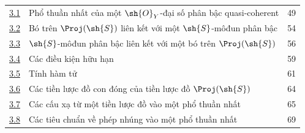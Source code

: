 \documentclass[oneside,10pt]{amsart}
\newcommand{\oldpage}[2][]{\marginnote{\normalfont\footnotesize\textbf{#1}~|~#2}\ignorespaces}
\begin{document}
\begin{longtable}{@{}p{}p{}r@{}}
\hyperref[subsection:II.3.1]{3.1} & Phổ thuần nhất của một $\sh{O}_Y$-đại số phân bậc quasi-coherent & 49\\
\hyperref[subsection:II.3.2]{3.2} & Bó trên $\Proj(\sh{S})$ liên kết với một $\sh{S}$-môđun phân bậc & 54\\
\hyperref[subsection:II.3.3]{3.3} & $\sh{S}$-môđun phân bậc liên kết với một bó trên $\Proj(\sh{S})$ & 56\\
\hyperref[subsection:II.3.4]{3.4} & Các điều kiện hữu hạn & 59\\
\hyperref[subsection:II.3.5]{3.5} & Tính hàm tử & 61\\
\hyperref[subsection:II.3.6]{3.6} & Các tiền lược đồ con đóng của tiền lược đồ $\Proj(\sh{S})$ & 64\\
\hyperref[subsection:II.3.7]{3.7} & Các cấu xạ từ một tiền lược đồ vào một phổ thuần nhất & 65\\
\hyperref[subsection:II.3.8]{3.8} & Các tiêu chuẩn về phép nhúng vào một phổ thuần nhất & 69\\
\end{longtable}
\oldpage[II]{214}
\end{document}
